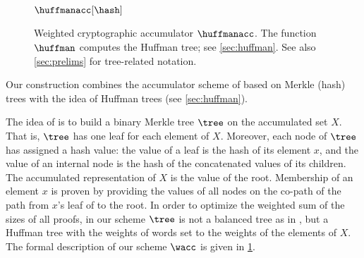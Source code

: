 \begin{figure}[!t]
\begin{algobox}{$\huffmanacc[\hash]$}
  \end{algobox}
  \caption{Weighted cryptographic accumulator $\huffmanacc$. The function $\huffman$ computes the Huffman tree; see \cref{sec:huffman}. See also \cref{sec:prelims} for tree-related notation.}%
  \label{fig:huffman_wacc}
\end{figure}
Our construction combines the accumulator scheme of \cite{ISC:CHKO08} based on Merkle (hash) trees with the idea of Huffman trees (see \cref{sec:huffman}).

The idea of \cite{ISC:CHKO08} is to build a binary Merkle tree $\tree$ on the accumulated set $X$. That is, $\tree$ has
one leaf for each element of $X$. Moreover, each node of $\tree$ has assigned a hash value: the value of a leaf is the
hash of its element $x$, and the value of an internal node is the hash of the concatenated values of its children. The
accumulated representation of $X$ is the value of the root. Membership of an element $x$ is proven by providing the
values of all nodes on the co-path of the path from $x$'s leaf of to the root.
In order to optimize the weighted sum of the sizes of all proofs, in our scheme $\tree$ is not a balanced tree as in
\cite{ISC:CHKO08}, but a Huffman tree with the weights of words set to the weights of the elements of $X$. The formal description of our scheme $\wacc$ is given in \cref{fig:huffman_wacc}.

